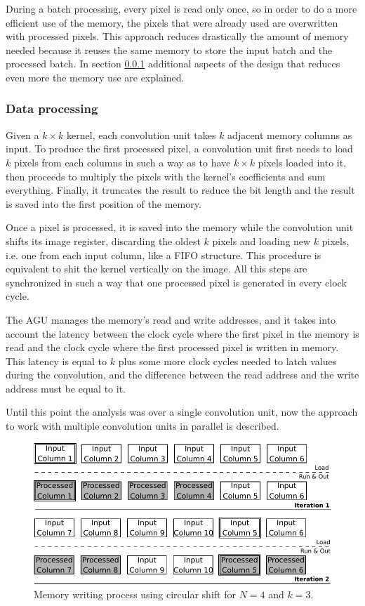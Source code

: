 \documentclass[conference,compsoc]{IEEEtran}
\begin{document}
During a batch processing, every pixel is read only once, so in order to do a
more efficient use of the memory, the pixels that were already used are
overwritten with processed pixels. This approach reduces drastically the amount
of memory needed because it reuses the same memory to store the input batch and the
processed batch. In section \ref{dataproc} additional aspects of the design
that reduces even more the memory use are explained.

\subsubsection{Data processing}\label{dataproc}
Given a $k\times k$ kernel, each convolution unit takes $k$ adjacent memory columns as
input. To produce the first processed pixel, a convolution unit first needs to
load $k$ pixels from each columns in such a way as to have $k\times
k$ pixels loaded into it, then proceeds to multiply the pixels with the kernel's
coefficients and sum everything. Finally, it truncates the result to reduce the
bit length and the result is saved into the first position of the memory.

Once a pixel is processed, it is saved into the memory while the convolution unit
shifts its image register, discarding the oldest $k$ pixels and loading new $k$
pixels, i.e. one from each input column, like a FIFO structure.
This procedure is equivalent to shit the kernel vertically on the image. All this steps are synchronized in such a way that
one processed pixel is generated in every clock cycle.

The AGU manages the memory's read and write addresses, and it takes into account the
latency between the clock cycle where the first pixel in the memory is read and
the clock cycle where the first processed pixel is written in memory. This latency is
equal to $k$ plus some more clock cycles needed to latch values during the
convolution, and the difference between the read address and the write address
must be equal to it.

Until this point the analysis was over a single convolution unit, now the
approach to work with multiple convolution units in parallel is
described.

\begin{figure}[!t]
\centering
\includegraphics[scale=0.55]{algorithm}
\caption{Memory writing process using circular shift for $N = 4$ and $k = 3$.}
\label{algorithm}
\end{figure}
\end{document}
